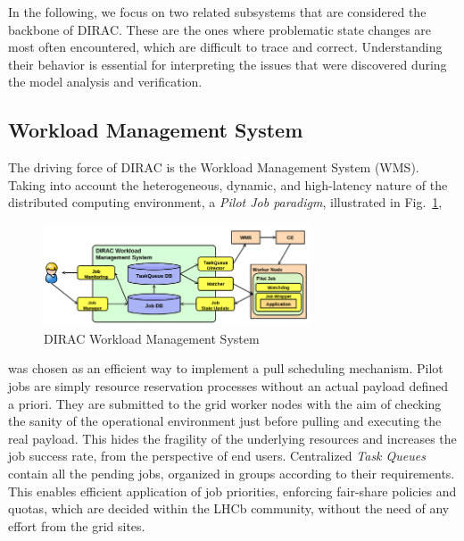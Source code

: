 \documentclass[sort&compress,preprint,3p]{elsarticle}
\begin{document}
In the following, we focus on two related subsystems that are considered the backbone of DIRAC. These
are the ones where problematic state changes are most often encountered,
 which are difficult to trace and correct. Understanding their behavior 
is essential for interpreting the issues that were discovered during the model analysis and verification.

\subsection{Workload Management System}

The driving force of DIRAC is the Workload Management System (WMS). Taking into
account the heterogeneous, dynamic, and high-latency nature of the distributed computing environment, a
\textit{Pilot Job paradigm}, illustrated in Fig.~\ref{fig:DIRAC-WMS}, 
\begin{figure}[bp]
\includegraphics[width=0.7\textwidth]{./Figure2.png}
\centering
\caption{DIRAC Workload Management System \cite{DIRAC_pilot_WMS}}
\label{fig:DIRAC-WMS}
\end{figure}
was chosen as an efficient way to
implement a pull scheduling mechanism.  Pilot jobs are simply resource
reservation processes without an actual payload defined a priori. They are
submitted to the grid worker nodes with the aim of checking the sanity of the
operational environment just before pulling and executing the real payload. This
hides the fragility of the underlying resources and increases the job success
rate, from the perspective of end users. Centralized \textit{Task Queues} contain all the
pending jobs, organized in groups according to their requirements. This enables
efficient application of job priorities, enforcing fair-share policies and
quotas, which are decided within the LHCb community, without the need of any
effort from the grid sites.  
\end{document}
